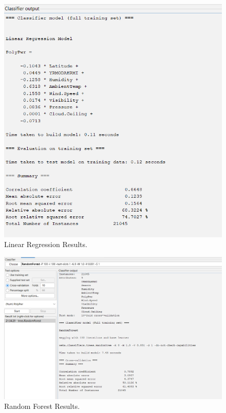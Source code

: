 \documentclass[10pt,twocolumn]{article}
\begin{document}
\begin{figure}
            \centering
            \includegraphics[width=1\linewidth]{LinReg.png}
            \caption{Linear Regression Results.}
            \label{fig:enter-label}
        \end{figure}
         
    
    \label{Figure 1}

\begin{figure}
    \centering
    \includegraphics[width=1\linewidth]{Randomforest.png}
    \caption{ Random Forest Results.}
    \label{Figure 2}
\end{figure}
 


\printbibliography
\end{document}
